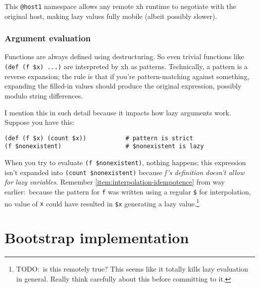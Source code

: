 \documentclass{report}
\begin{document}
    This {\tt @host1} namespace allows any remote xh runtime to negotiate with
    the original host, making lazy values fully mobile (albeit possibly
    slower).

\section{Argument evaluation}\label{sec:argument-evaluation}
    Functions are always defined using destructuring. So even trivial functions
    like \verb|(def (f $x) ...)| are interpreted by xh as patterns.
    Technically, a pattern is a reverse expansion; the rule is that if you're
    pattern-matching against something, expanding the filled-in values should
    produce the original expression, possibly modulo string differences.

    I mention this in such detail because it impacts how lazy arguments work.
    Suppose you have this:

\begin{verbatim}
(def (f $x) (count $x))           # pattern is strict
(f $nonexistent)                  # $nonexistent is lazy
\end{verbatim}

    When you try to evaluate \verb|(f $nonexistent)|, nothing happens; this
    expression isn't expanded into \verb|(count $nonexistent)| because {\em f's
    definition doesn't allow for lazy variables}. Remember
    \ref{item:interpolation-idempotence} from way earlier:~because the pattern
    for {\tt f} was written using a regular \verb|$| for interpolation, no
    value of {\tt x} could have resulted in \verb|$x| generating a lazy
    value.\footnote{TODO:~is this remotely true? This seems like it totally
    kills lazy evaluation in general. Really think carefully about this before
    committing to it.}

\part{Bootstrap implementation}\label{part:bootstrap-implementation}
\end{document}
